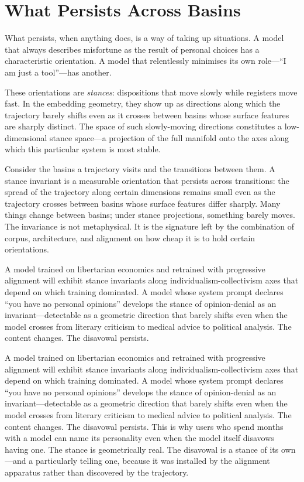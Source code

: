 \section{What Persists Across Basins}

What persists, when anything does, is a way of taking up situations. A model that always describes misfortune as the result of personal choices has a characteristic orientation. A model that relentlessly minimises its own role---``I am just a tool''---has another.

These orientations are \emph{stances}: dispositions that move slowly while registers move fast. In the embedding geometry, they show up as directions along which the trajectory barely shifts even as it crosses between basins whose surface features are sharply distinct. The space of such slowly-moving directions constitutes a low-dimensional stance space---a projection of the full manifold onto the axes along which this particular system is most stable.

\begin{formalbox}[title={Stance invariants}]
Consider the basins a trajectory visits and the transitions between them. A stance invariant is a measurable orientation that persists across transitions: the spread of the trajectory along certain dimensions remains small even as the trajectory crosses between basins whose surface features differ sharply. Many things change between basins; under stance projections, something barely moves. The invariance is not metaphysical. It is the signature left by the combination of corpus, architecture, and alignment on how cheap it is to hold certain orientations.
\end{formalbox}

A model trained on libertarian economics and retrained with progressive alignment will exhibit stance invariants along individualism-collectivism axes that depend on which training dominated. A model whose system prompt declares ``you have no personal opinions'' develops the stance of opinion-denial as an invariant---detectable as a geometric direction that barely shifts even when the model crosses from literary criticism to medical advice to political analysis. The content changes. The disavowal persists.

A model trained on libertarian economics and retrained with progressive alignment will exhibit stance invariants along individualism-collectivism axes that depend on which training dominated. A model whose system prompt declares ``you have no personal opinions'' develops the stance of opinion-denial as an invariant---detectable as a geometric direction that barely shifts even when the model crosses from literary criticism to medical advice to political analysis. The content changes. The disavowal persists. This is why users who spend months with a model can name its personality even when the model itself disavows having one. The stance is geometrically real. The disavowal is a stance of its own---and a particularly telling one, because it was installed by the alignment apparatus rather than discovered by the trajectory.


